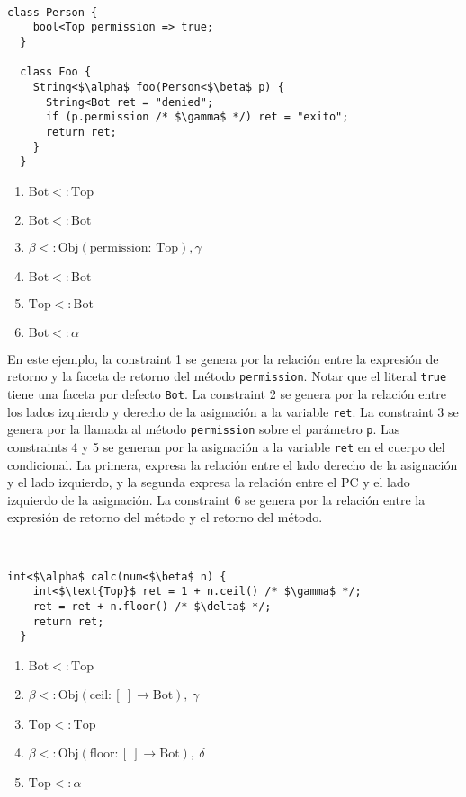 \begin{ej}\ \\
  \normalfont
  \label{gen2}
\begin{lstlisting}[mathescape=true]
  class Person {
    bool<Top permission => true;
  }

  class Foo {
    String<$\alpha$ foo(Person<$\beta$ p) {
      String<Bot ret = "denied";
      if (p.permission /* $\gamma$ */) ret = "exito";
      return ret;
    }
  }
\end{lstlisting}

\begin{enumerate}
  \item $\text{Bot} <: \text{Top}$
  \item $\text{Bot} <: \text{Bot}$
  \item $\beta <:\text{Obj}(\text{permission: }\text{Top}), \gamma$
  \item $\text{Bot} <: \text{Bot}$
  \item $\text{Top} <: \text{Bot}$
  \item $\text{Bot} <: \alpha$
\end{enumerate}
\end{ej}

En este ejemplo, la constraint 1 se genera por la relación entre la expresión de retorno y la faceta de retorno del método \texttt{permission}. Notar que el literal \texttt{true} tiene una faceta por defecto \texttt{Bot}. La constraint 2 se genera por la relación entre los lados izquierdo y derecho de la asignación a la variable \texttt{ret}. La constraint 3 se genera por la llamada al método \texttt{permission} sobre el parámetro \texttt{p}. Las constraints 4 y 5 se generan por la asignación a la variable \texttt{ret} en el cuerpo del condicional. La primera, expresa la relación entre el lado derecho de la asignación y el lado izquierdo, y la segunda expresa la relación entre el PC y el lado izquierdo de la asignación. La constraint 6 se genera por la relación entre la expresión de retorno del método y el retorno del método.

\begin{ej}\ \\
  \normalfont
  \label{gen3}
\begin{lstlisting}[mathescape=true]
  int<$\alpha$ calc(num<$\beta$ n) {
    int<$\text{Top}$ ret = 1 + n.ceil() /* $\gamma$ */;
    ret = ret + n.floor() /* $\delta$ */;
    return ret;
  }
\end{lstlisting}

\begin{enumerate}
  \item $\text{Bot} <: \text{Top}$
  \item $\beta <: \text{Obj}(\text{ceil}: [\ ] \rightarrow \text{Bot}),\ \gamma$
  \item $\text{Top} <: \text{Top}$
  \item $\beta <: \text{Obj}(\text{floor}: [\ ] \rightarrow \text{Bot}),\ \delta$
  \item $\text{Top} <: \alpha$
\end{enumerate}
\end{ej}

